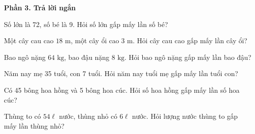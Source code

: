 \textbf{Phần 3. Trả lời ngắn}

\begin{ex} %
Số lớn là 72, số bé là 9. Hỏi số lớn gấp mấy lần số bé?
\end{ex}

\begin{ex} %
Một cây cau cao $18\text{ m}$, một cây ổi cao $3\text{ m}$. Hỏi cây cau cao gấp mấy lần cây ổi?
\end{ex}

\begin{ex} %
Bao ngô nặng $64\text{ kg}$, bao đậu nặng $8\text{ kg}$. Hỏi bao ngô nặng gấp mấy lần bao đậu?
\end{ex}

\begin{ex} %
Năm nay mẹ 35 tuổi, con 7 tuổi. Hỏi năm nay tuổi mẹ gấp mấy lần tuổi con?
\end{ex}

\begin{ex} %
Có 45 bông hoa hồng và 5 bông hoa cúc. Hỏi số hoa hồng gấp mấy lần số hoa cúc?
\end{ex}

\begin{ex} %
Thùng to có $54\ell$ nước, thùng nhỏ có $6\ell$ nước. Hỏi lượng nước thùng to gấp mấy lần thùng nhỏ?
\end{ex}
